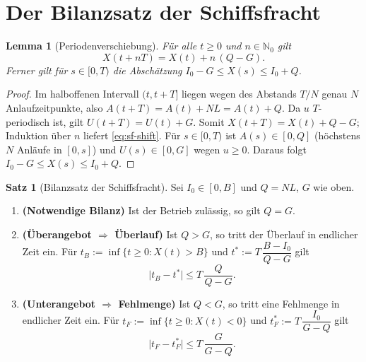 \documentclass[a4paper, 12pt, twoside, openright]{report}
\newtheorem{lemma}[theorem]{Lemma}
\theoremstyle{definition}
\theoremstyle{definition}
\newtheorem{satz}{Satz}[chapter]
\newcommand{\N}{\mathbb{N}}
\begin{document}
\section{Der Bilanzsatz der Schiffsfracht}\label{sec:sf-bilanz}

\begin{lemma}[Periodenverschiebung]\label{lem:sf-shift}
Für alle $t\ge0$ und $n\in\N_0$ gilt
\begin{equation}
  X(t+nT)=X(t)+n\,(Q-G).
  \label{eq:sf-shift}
\end{equation}
Ferner gilt für $s\in[0,T)$ die Abschätzung
$I_0-G\le X(s)\le I_0+Q$.
\end{lemma}

\begin{proof}
Im halboffenen Intervall $(t,t+T]$ liegen wegen des Abstands $T/N$ genau $N$
Anlaufzeitpunkte, also $A(t+T)=A(t)+NL=A(t)+Q$. Da $u$ $T$-periodisch ist, gilt
$U(t+T)=U(t)+G$. Somit $X(t+T)=X(t)+Q-G$; Induktion über $n$ liefert
\eqref{eq:sf-shift}. Für $s\in[0,T)$ ist $A(s)\in[0,Q]$ (höchstens $N$ Anläufe in
$[0,s]$) und $U(s)\in[0,G]$ wegen $u\ge0$. Daraus folgt
$I_0-G\le X(s)\le I_0+Q$.
\end{proof}

\begin{satz}[Bilanzsatz der Schiffsfracht]\label{satz:sf-bilanz}
Sei $I_0\in[0,B]$ und $Q=NL$, $G$ wie oben.
\begin{enumerate}
  \item \textbf{(Notwendige Bilanz)} Ist der Betrieb zulässig, so gilt $Q=G$.
  \item \textbf{(Überangebot $\Rightarrow$ Überlauf)} Ist $Q>G$, so tritt der Überlauf
    in endlicher Zeit ein. Für $t_B:=\inf\{t\ge 0:X(t)>B\}$ und
    $t^*:=T\,\dfrac{B-I_0}{Q-G}$ gilt
    \begin{equation}
      \bigl|t_B-t^*\bigr|\le T\,\frac{Q}{Q-G}.
      \label{eq:sf-tB}
    \end{equation}
  \item \textbf{(Unterangebot $\Rightarrow$ Fehlmenge)} Ist $Q<G$, so tritt eine
    Fehlmenge in endlicher Zeit ein. Für $t_F:=\inf\{t\ge 0:X(t)<0\}$ und
    $t^*_F:=T\,\dfrac{I_0}{G-Q}$ gilt
    \begin{equation}
      \bigl|t_F-t^*_F\bigr|\le T\,\frac{G}{G-Q}.
      \label{eq:sf-tF}
    \end{equation}
\end{enumerate}
\end{satz}
\end{document}
